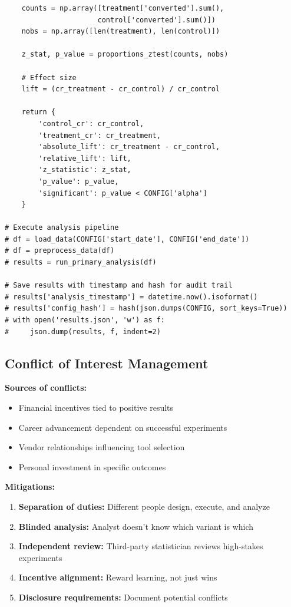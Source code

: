 \begin{lstlisting}
    counts = np.array([treatment['converted'].sum(),
                      control['converted'].sum()])
    nobs = np.array([len(treatment), len(control)])

    z_stat, p_value = proportions_ztest(counts, nobs)

    # Effect size
    lift = (cr_treatment - cr_control) / cr_control

    return {
        'control_cr': cr_control,
        'treatment_cr': cr_treatment,
        'absolute_lift': cr_treatment - cr_control,
        'relative_lift': lift,
        'z_statistic': z_stat,
        'p_value': p_value,
        'significant': p_value < CONFIG['alpha']
    }

# Execute analysis pipeline
# df = load_data(CONFIG['start_date'], CONFIG['end_date'])
# df = preprocess_data(df)
# results = run_primary_analysis(df)

# Save results with timestamp and hash for audit trail
# results['analysis_timestamp'] = datetime.now().isoformat()
# results['config_hash'] = hash(json.dumps(CONFIG, sort_keys=True))
# with open('results.json', 'w') as f:
#     json.dump(results, f, indent=2)
\end{lstlisting}

\subsection{Conflict of Interest Management}

\textbf{Sources of conflicts:}
\begin{itemize}
    \item Financial incentives tied to positive results
    \item Career advancement dependent on successful experiments
    \item Vendor relationships influencing tool selection
    \item Personal investment in specific outcomes
\end{itemize}

\textbf{Mitigations:}
\begin{enumerate}
    \item \textbf{Separation of duties:} Different people design, execute, and analyze

    \item \textbf{Blinded analysis:} Analyst doesn't know which variant is which

    \item \textbf{Independent review:} Third-party statistician reviews high-stakes experiments

    \item \textbf{Incentive alignment:} Reward learning, not just wins

    \item \textbf{Disclosure requirements:} Document potential conflicts
\end{enumerate}

